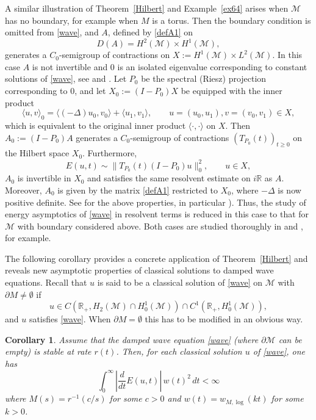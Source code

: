 \documentclass[11pt]{amsart}
\newtheorem{corollary}[theorem]{Corollary}
\theoremstyle{definition}
\theoremstyle{remark}
\numberwithin{equation}{section}
\begin{document}
A similar illustration of Theorem~\ref{Hilbert} and Example~\ref{ex64} arises when $\mathcal M$ has no boundary, for example
when $M$ is a torus. Then the boundary condition is omitted from
\eqref{wave}, and $A$, defined by \eqref{defA1} on
 \begin{equation*}
 D(A)=H^2(\mathcal M)\times H^1(\mathcal M),
 \end{equation*}
generates a $C_0$-semigroup of contractions on $X:=H^1(\mathcal M)\times
L^2(\mathcal M)$. In this case
$A$ is not invertible and $0$ is an isolated eigenvalue
corresponding to constant solutions of \eqref{wave}, see
\cite{Le96} and \cite{AnLe12}.  Let $P_0$ be the spectral (Riesz)
projection corresponding to $0$, and let $X_0:= (I-P_0)X$ be equipped
with the inner product $$\langle u, v \rangle_0 =
\langle (-\Delta) u_0, v_0 \rangle + \langle u_1,v_1\rangle, \qquad u=(u_0,u_1),
v=(v_0,v_1) \in X,$$
which is equivalent to the original inner product $\langle \cdot, \cdot \rangle$
on $X$. Then $A_0:=(I-P_0)A$ generates a $C_0$-semigroup of
contractions $(T_{P_0}(t))_{t \ge 0}$ on the Hilbert space $X_0$.
Furthermore,
\begin{equation*}
E(u,t) \sim \|T_{P_0}(t)(I-P_0)u\|^2_0, \qquad u \in X,
\end{equation*}
$A_0$ is invertible in $X_0$ and satisfies the same resolvent estimate
on $i\mathbb R$ as $A$.
Moreover, $A_0$ is given by the matrix \eqref{defA1} restricted to
$X_0$, where $-\Delta$ is now positive definite. See \cite{AnLe12} for the above
properties,
in particular \cite[Lemma 4.6 and p.~12]{AnLe12}). Thus, the study
of energy asymptotics of \eqref{wave} in resolvent terms is
reduced in this case to that for $\mathcal M$ with
boundary considered above.  Both cases are studied thoroughly
in \cite{Le96} and \cite[Parts I.2, II]{AnLe12}, for example.

The following corollary provides a concrete application of Theorem~\ref{Hilbert} and reveals new asymptotic properties of classical
solutions to damped wave equations. Recall that $u$ is said to be
a classical solution of \eqref{wave} on $\mathcal M$ with $\partial M\ne\emptyset$ if
$$
u \in C(\mathbb R_+,
H_2(\mathcal M) \cap H_0^1(\mathcal M))\cap C^1(\mathbb R_+, H^1_0(\mathcal M)),
$$
and $u$ satisfies \eqref{wave}.  When $\partial M =
\emptyset$ this has to be modified in an obvious way.

\begin{corollary}\label{c65}    Assume that the damped wave equation \eqref{wave} (where
$\partial \mathcal M$ can be empty) is stable at rate $r(t)$.
Then, for each classical solution $u$ of \eqref{wave}, one has
\begin{equation}\label{derivative}
\int_{0}^{\infty} \left|\frac{d}{dt} E(u,t)\right|\, w(t)^2\, dt<
\infty
\end{equation}
where  $M(s) = r^{-1}(c/s)$ for some $c>0$ and $w(t) =
w_{M,\log}(kt)$ for some $k>0$.
\end{corollary}
\end{document}
